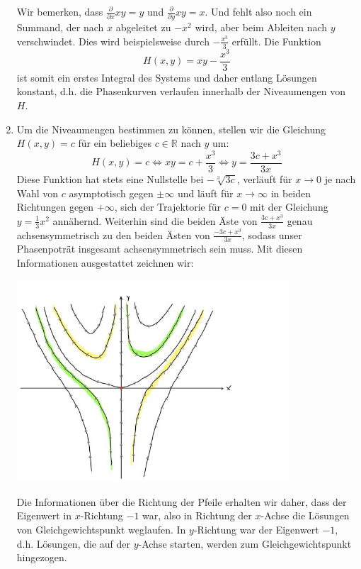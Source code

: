 \documentclass[a4paper]{article}
\begin{document}
\begin{enumerate}
    Wir bemerken, dass $\frac{\partial}{\partial x} xy = y$ und $\frac{\partial}{\partial y} xy = x$.
    Und fehlt also noch ein Summand, der nach $x$ abgeleitet zu $-x^2$ wird, aber beim Ableiten nach $y$ verschwindet.
    Dies wird beispielsweise durch $-\frac{x^3}{3}$ erfüllt.
    Die Funktion
    \begin{equation*}
        H(x,y) = xy - \frac{x^3}{3}
    \end{equation*}
    ist somit ein erstes Integral des Systems und daher entlang Lösungen konstant, d.h. die Phasenkurven verlaufen innerhalb der Niveaumengen von $H$.
    \item Um die Niveaumengen bestimmen zu können, stellen wir die Gleichung $H(x,y) = c$ für ein beliebiges $c \in \mathds{R}$ nach $y$ um:
    \begin{equation*}
        H(x,y) = c \iff xy = c + \frac{x^3}{3} \iff y = \frac{3c + x^3}{3x}
    \end{equation*} 
    Diese Funktion hat stets eine Nullstelle bei $-\sqrt[3]{3c}$, verläuft für $x \to 0$ je nach Wahl von $c$ asymptotisch gegen $\pm \infty$ und läuft für $x \to \infty$ in beiden Richtungen gegen $+\infty$, sich der Trajektorie für $c = 0$ mit der Gleichung $y = \frac{1}{3}x^2$ annähernd.
    Weiterhin sind die beiden Äste von $\frac{3c + x^3}{3x}$ genau achsensymmetrisch zu den beiden Ästen von $\frac{-3c +x^3}{3x}$, sodass unser Phasenpoträt insgesamt achsensymmetrisch sein muss.
    Mit diesen Informationen ausgestattet zeichnen wir:

    \begin{center}
        \includegraphics[width=0.8\textwidth]{phasenpotrait.jpeg}
    \end{center}


    Die Informationen über die Richtung der Pfeile erhalten wir daher, dass der Eigenwert in $x$-Richtung $-1$ war, also in Richtung der $x$-Achse die Lösungen von Gleichgewichtspunkt weglaufen. In $y$-Richtung war der Eigenwert $-1$, d.h. Lösungen, die auf der $y$-Achse starten, werden zum Gleichgewichtspunkt hingezogen.
\end{enumerate}
\end{document}
